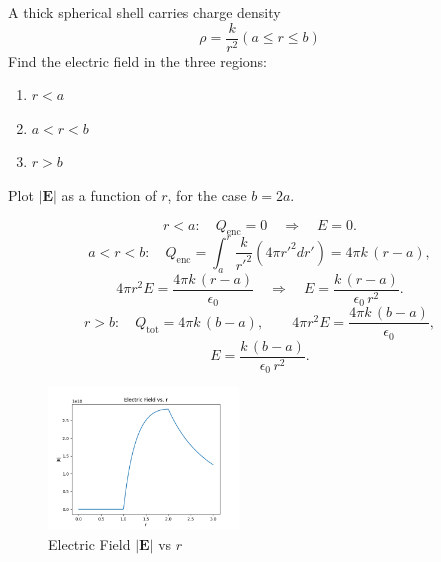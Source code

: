 \begin{hwkProblem}{2.15}{}

	A thick spherical shell carries charge density \[ \rho = \frac{k}{r^2} \left( a \leq r \leq b \right) \]
	Find the electric field in the three regions:
	\begin{enumerate}
		\item \( r < a \)
		\item \( a < r < b \)
		\item \( r > b \)
	\end{enumerate}
	Plot \( | \mathbf{E} | \) as a function of \( r \), for the case \( b = 2a \).

	\hwkSol

	\hwkPart
	\[
	r<a:\quad Q_{\text{enc}}=0\quad\Longrightarrow\quad E=0.
	\]
	\hwkPart
	\[
	a<r<b:\quad Q_{\text{enc}}=\int_a^r\frac{k}{r'^2}(4\pi r'^2dr')
	=4\pi k\,(r-a),
	\]
	\[
	4\pi r^2E=\frac{4\pi k\,(r-a)}{\epsilon_0}\quad\Longrightarrow\quad
	E=\frac{k\,(r-a)}{\epsilon_0\,r^2}.
	\]
	\hwkPart
	\[
	r>b:\quad Q_{\text{tot}}=4\pi k\,(b-a),\qquad
	4\pi r^2E=\frac{4\pi k\,(b-a)}{\epsilon_0},
	\]
	\[
	E=\frac{k\,(b-a)}{\epsilon_0\,r^2}.
	\]
	\hwkPart
	
	\begin{figure}[ht]
		\begin{center}
			\includegraphics[width=0.45\textwidth]{./images/s2_15.png}
		\end{center}
		\caption{Electric Field \( | \mathbf{E} | \) vs \( r \)}\label{fig:s2_15}
	\end{figure}

\end{hwkProblem}
